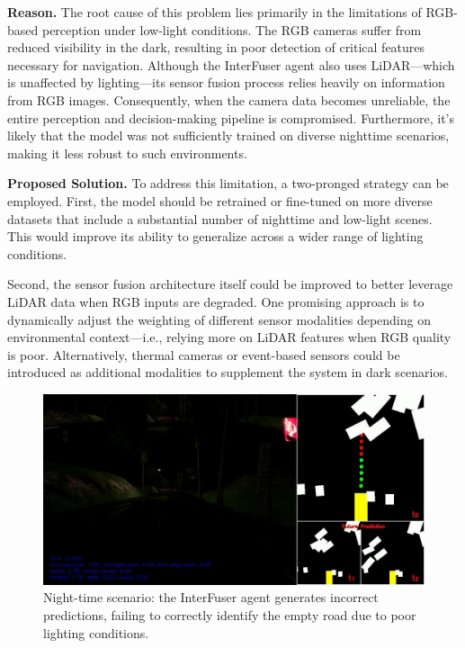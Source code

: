 \noindent\textbf{Reason.} The root cause of this problem lies primarily in the limitations of RGB-based perception under low-light conditions. The RGB cameras suffer from reduced visibility in the dark, resulting in poor detection of critical features necessary for navigation. Although the InterFuser agent also uses LiDAR—which is unaffected by lighting—its sensor fusion process relies heavily on information from RGB images. Consequently, when the camera data becomes unreliable, the entire perception and decision-making pipeline is compromised. Furthermore, it's likely that the model was not sufficiently trained on diverse nighttime scenarios, making it less robust to such environments.

\noindent\textbf{Proposed Solution.} To address this limitation, a two-pronged strategy can be employed. First, the model should be retrained or fine-tuned on more diverse datasets that include a substantial number of nighttime and low-light scenes. This would improve its ability to generalize across a wider range of lighting conditions.

Second, the sensor fusion architecture itself could be improved to better leverage LiDAR data when RGB inputs are degraded. One promising approach is to dynamically adjust the weighting of different sensor modalities depending on environmental context—i.e., relying more on LiDAR features when RGB quality is poor. Alternatively, thermal cameras or event-based sensors could be introduced as additional modalities to supplement the system in dark scenarios.

\begin{figure}[htbp]
    \centering
    \includegraphics[width=\linewidth]{images/RS01_dark.png}
    \caption{Night-time scenario: the InterFuser agent generates incorrect predictions, failing to correctly identify the empty road due to poor lighting conditions.}
    \label{fig:dark_RS01}
\end{figure}

